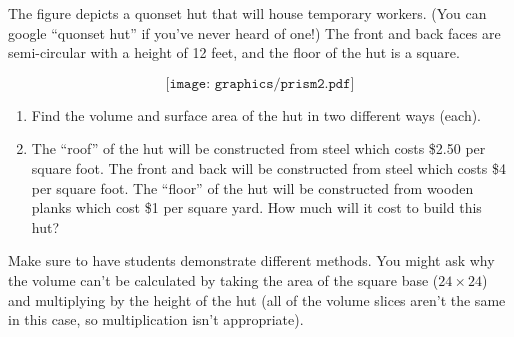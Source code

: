 \documentclass{ximera}
\begin{document}
\begin{problem}
The figure depicts a quonset hut that will house temporary workers.  (You can google ``quonset hut'' if you've never heard of one!)  The front and back faces are semi-circular with a height of 12 feet, and the floor of the hut is a square.

\[
\texttt{[image: graphics/prism2.pdf]}
\]

\begin{enumerate}
    \item Find the volume and surface area of the hut in two different ways (each).
    \item The ``roof'' of the hut will be constructed from steel which costs \$2.50 per square foot. The front and back will be constructed from steel which costs \$4 per square foot.  The ``floor'' of the hut will be constructed from wooden planks which cost \$1 per square yard. How much will it cost to build this hut?
\end{enumerate}

\begin{instructorNotes}
Make sure to have students demonstrate different methods.  You might ask why the volume can't be calculated by taking the area of the square base ($24 \times 24$) and multiplying by the height of the hut (all of the volume slices aren't the same in this case, so multiplication isn't appropriate).  
\end{instructorNotes}
\end{problem}
\end{document}
